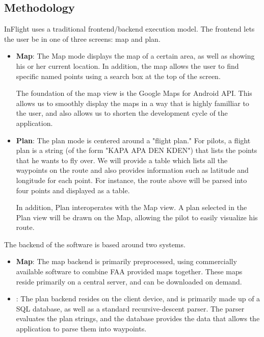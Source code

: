 \documentclass[10pt,a4paper]{article}
\begin{document}
\subsection{Methodology}
InFlight uses a traditional frontend/backend execution model. The frontend lets the user be in one of three screens: map and plan. 
\begin{itemize}
\item \textbf{Map}: The Map mode displays the map of a certain area, as well as showing his or her current location. In addition, the map allows the user to find specific named points using a search box at the top of the screen.

The foundation of the map view is the Google Maps for Android API. This allows us to smoothly display the maps in a way that is highly familliar to the user, and also allows us to shorten the development cycle of the application.
\item \textbf{Plan}: The plan mode is centered around a "flight plan." For pilots, a flight plan is a string (of the form "KAPA APA DEN KDEN") that lists the points that he wants to fly over. We will provide a table which lists all the waypoints on the route and also provides information such as latitude and longitude for each point. For instance, the route above will be parsed into four points and displayed as a table. 

In addition, Plan interoperates with the Map view. A plan selected in the Plan view will be drawn on the Map, allowing the pilot to easily visualize his route.
\end{itemize}
The backend of the software is based around two systems.
\begin{itemize}
\item \textbf{Map}: The map backend is primarily preprocessed, using commercially available software to combine FAA provided maps together. These maps reside primarily on a central server, and can be downloaded on demand.
\item {}: The plan backend resides on the client device, and is primarily made up of a SQL database, as well as a standard recursive-descent parser. The parser evaluates the plan strings, and the database provides the data that allows the application to parse them into waypoints.
\end{itemize}
\end{document}
